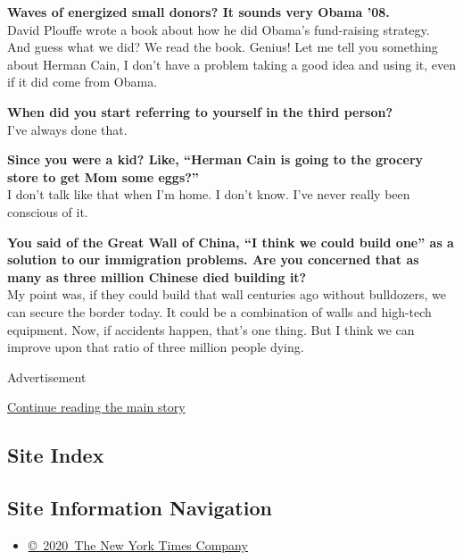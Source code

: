 \textbf{Waves of energized small donors? It sounds very Obama '08.}\\
David Plouffe wrote a book about how he did Obama's fund-raising
strategy. And guess what we did? We read the book. Genius! Let me tell
you something about Herman Cain, I don't have a problem taking a good
idea and using it, even if it did come from Obama.

\textbf{When did you start referring to yourself in the third person?}\\
I've always done that.

\textbf{Since you were a kid? Like, ``Herman Cain is going to the
grocery store to get Mom some eggs?''}\\
I don't talk like that when I'm home. I don't know. I've never really
been conscious of it.

\textbf{You said of the Great Wall of China, ``I think we could build
one'' as a solution to our immigration problems. Are you concerned that
as many as three million Chinese died building it?}\\
My point was, if they could build that wall centuries ago without
bulldozers, we can secure the border today. It could be a combination of
walls and high-tech equipment. Now, if accidents happen, that's one
thing. But I think we can improve upon that ratio of three million
people dying.

Advertisement

\protect\hyperlink{after-bottom}{Continue reading the main story}

\hypertarget{site-index}{%
\subsection{Site Index}\label{site-index}}

\hypertarget{site-information-navigation}{%
\subsection{Site Information
Navigation}\label{site-information-navigation}}

\begin{itemize}
\tightlist
\item
  \href{https://help.nytimes.com/hc/en-us/articles/115014792127-Copyright-notice}{©~2020~The
  New York Times Company}
\end{itemize}

